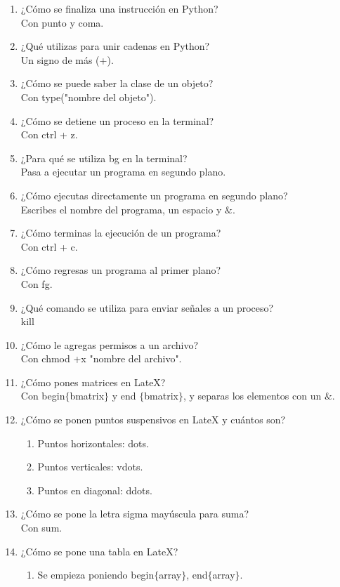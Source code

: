 \documentclass[letterpaper, 12pt, oneside]{article} %
\begin{document}
\begin{enumerate}
		\item ¿Cómo se finaliza una instrucción en Python?\\Con punto y coma. 
		\item ¿Qué utilizas para unir cadenas en Python?\\ Un signo de más (+). 
		\item ¿Cómo se puede saber la clase de un objeto?\\Con type("nombre del objeto").
		\item ¿Cómo se detiene un proceso en la terminal?\\Con ctrl + z.
		\item ¿Para qué se utiliza bg en la terminal?\\Pasa a ejecutar un programa en segundo plano.
		\item ¿Cómo ejecutas directamente un programa en segundo plano?\\Escribes el nombre del programa, un espacio y $\&$.
		\item ¿Cómo terminas la ejecución de un programa?\\Con ctrl + c.
		\item ¿Cómo regresas un programa al primer plano?\\Con fg.
		\item ¿Qué comando se utiliza para enviar señales a un proceso?\\kill
		\item ¿Cómo le agregas permisos a un archivo?\\Con chmod +x "nombre del archivo".
		\item ¿Cómo pones matrices en LateX?\\Con begin$\{$bmatrix$\}$ y end $\{$bmatrix$\}$, y separas los elementos con un $\&$.
		\item ¿Cómo se ponen puntos suspensivos en LateX y cuántos son?
		\begin{enumerate}
			\item Puntos horizontales: dots.
			\item Puntos verticales: vdots.
			\item Puntos en diagonal: ddots.
		\end{enumerate}
		\item ¿Cómo se pone la letra sigma mayúscula para suma?\\Con sum.
		\item ¿Cómo se pone una tabla en LateX?
		\begin{enumerate}
			\item Se empieza poniendo begin$\{$array$\}$, end$\{$array$\}$.

\end{enumerate}
\end{enumerate}
\end{document}
